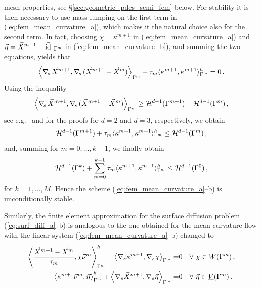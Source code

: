 mesh properties, see \S\ref{sec:geometric_pdes_semi_fem} below.
For stability it is
then necessary to use mass lumping on the first term in
(\ref{eq:fem_mean_curvature_a}), which makes it the natural
choice also for the second term. In fact, choosing $\chi=\kappa^{m+1}$ in
(\ref{eq:fem_mean_curvature_a}) and $\vec \eta=\vec X^{m+1} -
\vec{\rm id}\!\mid_{\Gamma^m}$ in (\ref{eq:fem_mean_curvature_b}), and summing the
two equations, yields that
\begin{equation*}
\left\langle \nabla_{\!s}\,\vec X^{m+1}, \nabla_{\!s}\,(\vec X^{m+1} - \vec X^m)
\right\rangle_{\Gamma^m} +
\tau_m\langle \kappa^{m+1},\kappa^{m+1}\rangle^h_{\Gamma^m}=0\,.
\end{equation*}
Using the inequality
\begin{equation}\label{eq:delta_length_inequality}
\left\langle \nabla_{\!s}\,\vec X^{m+1}, \nabla_{\!s}\,(\vec X^{m+1} - \vec X^m)
\right\rangle_{\Gamma^m} \geq \mathcal{H}^{d-1}(\Gamma^{m+1}) - \mathcal{H}^{d-1}(\Gamma^m)\,,
\end{equation}
see e.g.\ \cite[Proof of Theorem~2.3]{triplej} and
\cite[Proof of Theorem~2.2]{gflows3d} for the proofs for $d=2$ and $d=3$,
respectively, we obtain
\begin{equation*}
\mathcal{H}^{d-1}(\Gamma^{m+1}) +
\tau_m \langle \kappa^{m+1},\kappa^{m+1}\rangle^h_{\Gamma^m}
\leq \mathcal{H}^{d-1}(\Gamma^m)\,,
\end{equation*}
and, summing for $m=0,\ldots,k-1$, we finally obtain
\begin{equation*}
\mathcal{H}^{d-1}(\Gamma^k)+\sum_{m=0}^{k-1} \tau_m
\langle \kappa^{m+1},\kappa^{m+1}\rangle^h_{\Gamma^m}
\leq \mathcal{H}^{d-1}(\Gamma^0)\,,
\end{equation*}
for ${k=1,\ldots,M}$. Hence the scheme (\ref{eq:fem_mean_curvature_a}--b) is
unconditionally stable.

Similarly, the finite element approximation for the surface diffusion problem
(\ref{eq:surf_diff_a}--b) is analogous to the one obtained for the mean
curvature flow with the linear system (\ref{eq:fem_mean_curvature_a}--b)
changed to
\begin{subequations}
\begin{align}
\left\langle \frac{\vec X^{m + 1} - \vec X^m}{\tau_m},
\chi\vec \nu^m\right\rangle_{\Gamma^m}^h - \left\langle\nabla_s\kappa^{m+1},
\nabla_s\chi\right\rangle_{\Gamma^m} =& 0\quad \forall\ \chi \in
\Wh\,,\label{eq:fem_surf_diff_a}\\
\left\langle\kappa^{m+1}\vec \nu^m, \vec \eta\right\rangle_{\Gamma^m}^h +
\left\langle\nabla_s\vec X^{m + 1},
\nabla_s\vec \eta\right\rangle_{\Gamma^m} =& 0\quad \forall\ \vec\eta \in\Vh\,.
\label{eq:fem_surf_diff_b}
\end{align}
\end{subequations}

